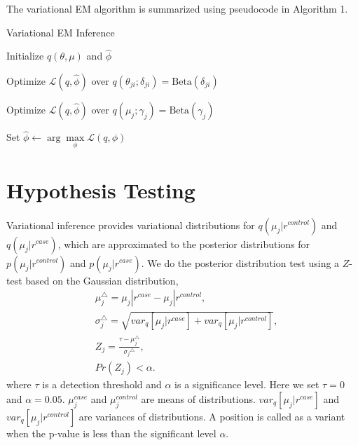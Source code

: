 \documentclass[11pt,reqno]{amsart}
\begin{document}
The variational EM algorithm is summarized using pseudocode in Algorithm 1.
\begin{algorithm}[h]
  \caption{Variational EM Inference}

  \begin{algorithmic}[1]

  \State Initialize $ q(\theta, \mu) $ and $\hat{\phi}$

  \Repeat

	\Repeat
	
			\State Optimize $\mathcal{L}(q, \hat{\phi})$ over $q(\theta_{ji}; \delta_{ji}) = \text{Beta} (\delta_{ji})$				
			\EndFor			
		\EndFor
	
			\State Optimize $\mathcal{L}(q, \hat{\phi})$ over $q(\mu_j; \gamma_j) = \text{Beta} (\gamma_j)$			
		\EndFor
	

  \State Set $\hat{\phi} \leftarrow \arg \max\limits_{\phi}
            \mathcal{L}(q,\phi)$

  \end{algorithmic}

\end{algorithm}
%
\section{Hypothesis Testing}
Variational inference provides variational distributions for $q(\mu_j|r^{control})$ and $q(\mu_j|r^{case})$, which are approximated to the posterior distributions for $p(\mu_j|r^{control})$ and $p(\mu_j|r^{case})$.
We do the posterior distribution test using a $Z$-test based on the Gaussian distribution,
\begin{align}
\label{eq:test}
& \mu_j^{\triangle} = \mu_j|r^{case}-\mu_j|r^{control},\\
& \sigma_j^{\triangle} = \sqrt {var_q{[\mu_j|r^{case}]} + var_q{[\mu_j|r^{control}]}},\\
& Z_j = \frac{\tau - \mu_j^{\triangle}}{{\sigma_j}^{\triangle}},\\
& Pr(Z_j) < \alpha.
\end{align}
where $\tau$ is a detection threshold and $\alpha$ is a significance level. Here we set $\tau = 0$ and $\alpha = 0.05$.
$\mu_j^{case}$ and $\mu_j^{control}$ are means of distributions.
$var_q{[\mu_j|r^{case}]}$ and  $var_q{[\mu_j|r^{control}]}$ are variances of distributions.
A position is called as a variant when the p-value is less than the significant level $\alpha$.
\end{document}
